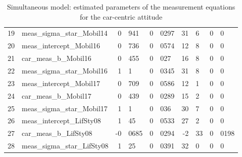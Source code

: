 \documentclass[12pt,a4paper]{article}
\begin{document}
\begin{table}[htb]
\begin{center}
\begin{tabular}{rlr@{.}lr@{.}lr@{.}lr@{.}l}
19 & meas\_sigma\_star\_Mobil14 & 0&941 & 0&0297 & 31&6 & 0&0 \\ 
20 & meas\_intercept\_Mobil16 & 0&736 & 0&0574 & 12&8 & 0&0 \\ 
21 & car\_meas\_b\_Mobil16 & 0&455 & 0&027 & 16&8 & 0&0 \\ 
22 & meas\_sigma\_star\_Mobil16 & 1&1 & 0&0345 & 31&8 & 0&0 \\ 
23 & meas\_intercept\_Mobil17 & 0&709 & 0&0586 & 12&1 & 0&0 \\ 
24 & car\_meas\_b\_Mobil17 & 0&439 & 0&0289 & 15&2 & 0&0 \\ 
25 & meas\_sigma\_star\_Mobil17 & 1&1 & 0&036 & 30&7 & 0&0 \\ 
26 & meas\_intercept\_LifSty08 & 1&45 & 0&0533 & 27&2 & 0&0 \\ 
27 & car\_meas\_b\_LifSty08 & -0&0685 & 0&0294 & -2&33 & 0&0198 \\ 
28 & meas\_sigma\_star\_LifSty08 & 1&25 & 0&0391 & 32&0 & 0&0 \\ 
\end{tabular}
  \caption{Simultaneous model: estimated parameters of the measurement equations for the car-centric attitude\label{tab:simulataneous_params_car_meas}}
  \end{center}
\end{table}
\end{document}
